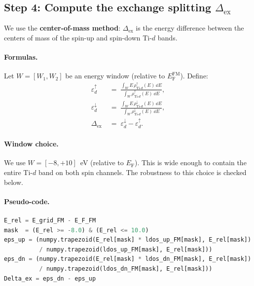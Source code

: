\documentclass[11pt,a4paper]{article}
\newcommand{\Ef}{E_{\mathrm{F}}}
\newcommand{\Tid}{\text{Ti-}d}
\newcommand{\rhoup}{\rho^{\uparrow}}
\newcommand{\rhodn}{\rho^{\downarrow}}
\newcommand{\Dex}{\Delta_{\text{ex}}}
\begin{document}
\subsection{Step 4: Compute the exchange splitting $\Dex$}

We use the \textbf{center-of-mass method}: $\Dex$ is the energy
difference between the centers of mass of the spin-up and spin-down
Ti-$d$ bands.

\paragraph{Formulas.} Let $W = [W_1, W_2]$ be an energy window
(relative to $\Ef^{\text{FM}}$). Define:
%
\begin{align}
    \varepsilon^{\uparrow}_{d}
        &\;=\;
        \frac{\int_{W} E \, \rhoup_{\Tid}(E) \,\dd E}
             {\int_{W} \rhoup_{\Tid}(E) \,\dd E},
    \label{eq:eps-up}\\[4pt]
    \varepsilon^{\downarrow}_{d}
        &\;=\;
        \frac{\int_{W} E \, \rhodn_{\Tid}(E) \,\dd E}
             {\int_{W} \rhodn_{\Tid}(E) \,\dd E},
    \label{eq:eps-dn}\\[4pt]
    \Dex
        &\;=\;
        \varepsilon^{\downarrow}_{d} - \varepsilon^{\uparrow}_{d}.
    \label{eq:Dex}
\end{align}

\paragraph{Window choice.} We use $W = [-8, +10]$~eV (relative to
$\Ef$). This is wide enough to contain the entire Ti-$d$ band on both
spin channels. The robustness to this choice is checked below.

\paragraph{Pseudo-code.}
\begin{lstlisting}[language=Python]
E_rel = E_grid_FM - E_F_FM
mask  = (E_rel >= -8.0) & (E_rel <= 10.0)
eps_up = (numpy.trapezoid(E_rel[mask] * ldos_up_FM[mask], E_rel[mask])
          / numpy.trapezoid(ldos_up_FM[mask], E_rel[mask]))
eps_dn = (numpy.trapezoid(E_rel[mask] * ldos_dn_FM[mask], E_rel[mask])
          / numpy.trapezoid(ldos_dn_FM[mask], E_rel[mask]))
Delta_ex = eps_dn - eps_up
\end{lstlisting}
\end{document}
